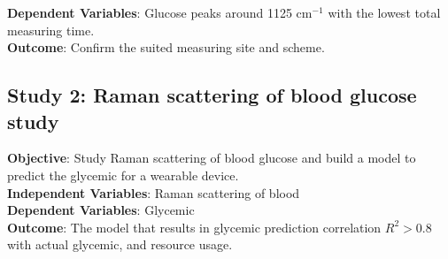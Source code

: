 \begin{sloppypar}
    \textbf{Dependent Variables}: Glucose peaks around 1125 $\text{cm}^{-1}$ with the lowest total measuring time.\\
    \textbf{Outcome}: Confirm the suited measuring site and scheme.
\end{sloppypar}




\subsection{Study 2: Raman scattering of blood glucose study}\label{intro-s2}

\textbf{Objective}: Study Raman scattering of blood glucose and build a model to predict the glycemic for a wearable device.\\
\textbf{Independent Variables}: Raman scattering of blood\\
\textbf{Dependent Variables}: Glycemic\\
\textbf{Outcome}: The model that results in glycemic prediction correlation $R^2 > 0.8$ with actual glycemic, and resource usage.





